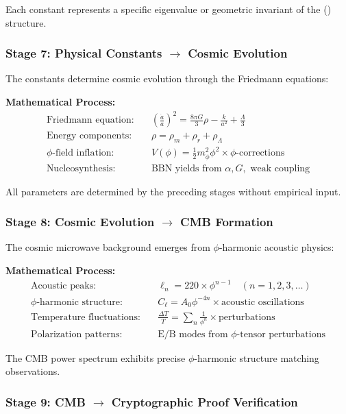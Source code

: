 Each constant represents a specific eigenvalue or geometric invariant of the () structure.

\subsubsection{Stage 7: Physical Constants $\rightarrow$ Cosmic Evolution}

The constants determine cosmic evolution through the Friedmann equations:

\textbf{Mathematical Process:}
\begin{align}
\text{Friedmann equation:} &\quad \left(\frac{\dot{a}}{a}\right)^2 = \frac{8\pi G}{3}\rho - \frac{k}{a^2} + \frac{\Lambda}{3}\\
\text{Energy components:} &\quad \rho = \rho_m + \rho_r + \rho_\Lambda\\
\text{$\phi$-field inflation:} &\quad V(\phi) = \frac{1}{2}m_\phi^2 \phi^2 \times \text{$\phi$-corrections}\\
\text{Nucleosynthesis:} &\quad \text{BBN yields from } \alpha, G, \text{ weak coupling}
\end{align}

All parameters are determined by the preceding stages without empirical input.

\subsubsection{Stage 8: Cosmic Evolution $\rightarrow$ CMB Formation}

The cosmic microwave background emerges from $\phi$-harmonic acoustic physics:

\textbf{Mathematical Process:}
\begin{align}
\text{Acoustic peaks:} &\quad \ell_n = 220 \times \phi^{n-1} \quad (n = 1, 2, 3, \ldots)\\
\text{$\phi$-harmonic structure:} &\quad C_\ell = A_0 \phi^{-4n} \times \text{acoustic oscillations}\\
\text{Temperature fluctuations:} &\quad \frac{\Delta T}{T} = \sum_{n} \frac{1}{\phi^n} \times \text{perturbations}\\
\text{Polarization patterns:} &\quad \text{E/B modes from } \phi\text{-tensor perturbations}
\end{align}

The CMB power spectrum exhibits precise $\phi$-harmonic structure matching observations.

\subsubsection{Stage 9: CMB $\rightarrow$ Cryptographic Proof Verification}

